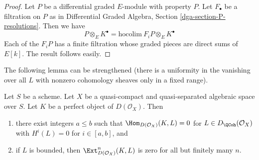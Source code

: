 \begin{proof}
Let $P$ be a differential graded $E$-module with property $P$.
Let $F_\bullet$ be a filtration on $P$ as in
Differential Graded Algebra, Section \ref{dga-section-P-resolutions}.
Then we have
$$
P \otimes_E K^\bullet = \text{hocolim}\ F_iP \otimes_E K^\bullet
$$
Each of the $F_iP$ has a finite filtration whose graded pieces
are direct sums of $E[k]$. The result follows easily.
\end{proof}

\noindent
The following lemma can be strengthened (there is a uniformity
in the vanishing over all $L$ with nonzero cohomology sheaves
only in a fixed range).

\begin{lemma}
\label{lemma-ext-from-perfect-into-bounded-QCoh}
Let $S$ be a scheme.
Let $X$ be a quasi-compact and quasi-separated algebraic space over $S$.
Let $K$ be a perfect object of $D(\mathcal{O}_X)$. Then
\begin{enumerate}
\item there exist integers $a \leq b$ such that
$\Hom_{D(\mathcal{O}_X)}(K, L) = 0$ for $L \in D_\QCoh(\mathcal{O}_X)$
with $H^i(L) = 0$ for $i \in [a, b]$, and
\item if $L$ is bounded, then $\Ext^n_{D(\mathcal{O}_X)}(K, L)$
is zero for all but finitely many $n$.
\end{enumerate}
\end{lemma}

